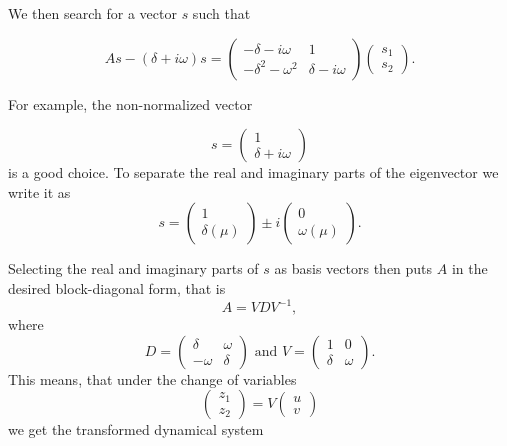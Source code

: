 \documentclass[twoside,10pt,a4paper]{article}
\begin{document}
We then search for a vector $s$ such that 

$$
As-(\delta + i\omega)s =\begin{pmatrix}-\delta - i\omega & 1 \\ -\delta^2 -\omega^2 & \delta-i\omega  \end{pmatrix}   \begin{pmatrix} s_1 \\ s_2\end{pmatrix}.
$$

For example, the non-normalized vector

$$
s = \begin{pmatrix} 1  \\ \delta + i\omega \end{pmatrix}
$$
is a good choice. To separate the real and imaginary parts of the eigenvector we write it as 
$$
s= \begin{pmatrix} 1\\ \delta(\mu) \end{pmatrix}\pm i \begin{pmatrix} 0 \\ \omega(\mu) \end{pmatrix}.
$$

Selecting the real and imaginary parts of $s$ as basis vectors then puts $A$ in the desired block-diagonal form,  that is 
$$
A=VDV^{-1},
$$
where $$
D=\begin{pmatrix} \delta & \omega \\ -\omega & \delta \end{pmatrix} \text{ and } V=\begin{pmatrix} 1 & 0 \\ \delta & \omega  \end{pmatrix}.
$$
This means, that under  the change of variables 
$$
\begin{pmatrix} z_1 \\ z_2 \end{pmatrix} = V \begin{pmatrix} u \\ v\end{pmatrix}
$$
 we get the transformed dynamical system
 
\end{document}
